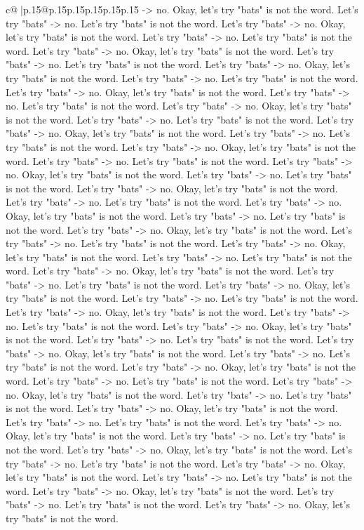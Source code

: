 \documentclass{article}
\begin{document}
{\begin{supertabular}{c@{$\;$}|p{.15\linewidth}@{}p{.15\linewidth}p{.15\linewidth}p{.15\linewidth}p{.15\linewidth}p{.15\linewidth}}
{{{{-}> no. Okay, let's try "bats" is not the word. Let's try "bats" {-}> no. Let's try "bats" is not the word. Let's try "bats" {-}> no. Okay, let's try "bats" is not the word. Let's try "bats" {-}> no. Let's try "bats" is not the word. Let's try "bats" {-}> no. Okay, let's try "bats" is not the word. Let's try "bats" {-}> no. Let's try "bats" is not the word. Let's try "bats" {-}> no. Okay, let's try "bats" is not the word. Let's try "bats" {-}> no. Let's try "bats" is not the word. Let's try "bats" {-}> no. Okay, let's try "bats" is not the word. Let's try "bats" {-}> no. Let's try "bats" is not the word. Let's try "bats" {-}> no. Okay, let's try "bats" is not the word. Let's try "bats" {-}> no. Let's try "bats" is not the word. Let's try "bats" {-}> no. Okay, let's try "bats" is not the word. Let's try "bats" {-}> no. Let's try "bats" is not the word. Let's try "bats" {-}> no. Okay, let's try "bats" is not the word. Let's try "bats" {-}> no. Let's try "bats" is not the word. Let's try "bats" {-}> no. Okay, let's try "bats" is not the word. Let's try "bats" {-}> no. Let's try "bats" is not the word. Let's try "bats" {-}> no. Okay, let's try "bats" is not the word. Let's try "bats" {-}> no. Let's try "bats" is not the word. Let's try "bats" {-}> no. Okay, let's try "bats" is not the word. Let's try "bats" {-}> no. Let's try "bats" is not the word. Let's try "bats" {-}> no. Okay, let's try "bats" is not the word. Let's try "bats" {-}> no. Let's try "bats" is not the word. Let's try "bats" {-}> no. Okay, let's try "bats" is not the word. Let's try "bats" {-}> no. Let's try "bats" is not the word. Let's try "bats" {-}> no. Okay, let's try "bats" is not the word. Let's try "bats" {-}> no. Let's try "bats" is not the word. Let's try "bats" {-}> no. Okay, let's try "bats" is not the word. Let's try "bats" {-}> no. Let's try "bats" is not the word. Let's try "bats" {-}> no. Okay, let's try "bats" is not the word. Let's try "bats" {-}> no. Let's try "bats" is not the word. Let's try "bats" {-}> no. Okay, let's try "bats" is not the word. Let's try "bats" {-}> no. Let's try "bats" is not the word. Let's try "bats" {-}> no. Okay, let's try "bats" is not the word. Let's try "bats" {-}> no. Let's try "bats" is not the word. Let's try "bats" {-}> no. Okay, let's try "bats" is not the word. Let's try "bats" {-}> no. Let's try "bats" is not the word. Let's try "bats" {-}> no. Okay, let's try "bats" is not the word. Let's try "bats" {-}> no. Let's try "bats" is not the word. Let's try "bats" {-}> no. Okay, let's try "bats" is not the word. Let's try "bats" {-}> no. Let's try "bats" is not the word. Let's try "bats" {-}> no. Okay, let's try "bats" is not the word. Let's try "bats" {-}> no. Let's try "bats" is not the word. Let's try "bats" {-}> no. Okay, let's try "bats" is not the word. Let's try "bats" {-}> no. Let's try "bats" is not the word. Let's try "bats" {-}> no. Okay, let's try "bats" is not the word. Let's try "bats" {-}> no. Let's try "bats" is not the word. Let's try "bats" {-}> no. Okay, let's try "bats" is not the word. Let's try "bats" {-}> no. Let's try "bats" is not the word. Let's try "bats" {-}> no. Okay, let's try "bats" is not the word. }}}
\end{supertabular}}
\end{document}
